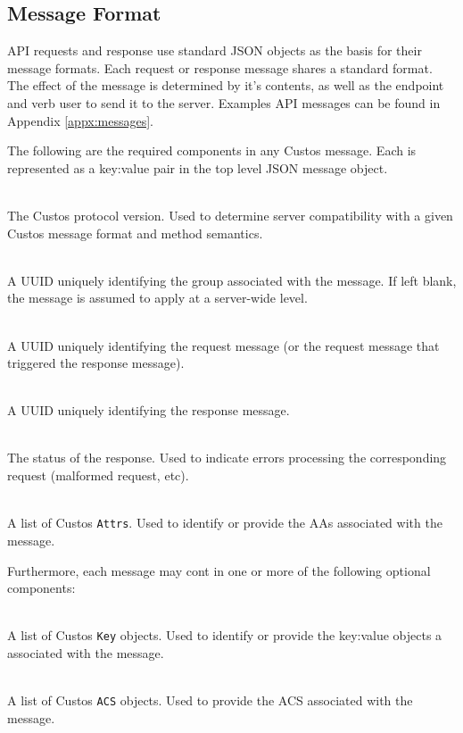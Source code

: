 \subsection{Message Format}

API requests and response use standard JSON objects as the basis for
their message formats. Each request or response message shares a
standard format. The effect of the message is determined by it's
contents, as well as the endpoint and verb user to send it to the
server. Examples API messages can be found in Appendix
\ref{appx:messages}.

The following are the required components in any Custos message. Each
is represented as a key:value pair in the top level JSON message
object.

\begin{packed_desc}
\item[\texttt{Version}] \hfill \\ The Custos protocol version. Used to
  determine server compatibility with a given Custos message format
  and method semantics.
\item[\texttt{Group}] \hfill \\ A UUID uniquely identifying the group
  associated with the message. If left blank, the message is assumed
  to apply at a server-wide level.
\item[\texttt{ReqID}] \hfill \\ A UUID uniquely identifying the
  request message (or the request message that triggered the response
  message).
\item[\texttt{ResID} (Response Only)] \hfill \\ A UUID uniquely
  identifying the response message.
\item[\texttt{Status} (Response Only)] \hfill \\ The status of the
  response. Used to indicate errors processing the corresponding
  request (malformed request, etc).
\item[\texttt{Attrs}] \hfill \\ A list of Custos \texttt{Attrs}. Used
  to identify or provide the AAs associated with the message.
\end{packed_desc}

Furthermore, each message may cont in one or more of the following
optional components:

\begin{packed_desc}
\item[\texttt{Keys}] \hfill \\ A list of Custos \texttt{Key}
  objects. Used to identify or provide the key:value objects a
  associated with the message.
\item[\texttt{ACSs}] \hfill \\ A list of Custos \texttt{ACS}
  objects. Used to provide the ACS associated with the message.
\end{packed_desc}

